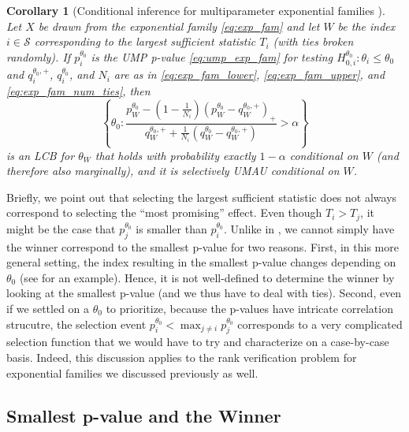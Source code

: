 \documentclass{article}
\newtheorem{corollary}{Corollary}
\begin{document}
\begin{appendix}
\begin{corollary}[Conditional inference for multiparameter exponential families ]
    \label{cor:cond_exp_fam}
    Let $X$ be drawn from the exponential family \eqref{eq:exp_fam} and let $W$ be the index $i \in \mathcal{S}$ corresponding to the largest sufficient statistic $T_i$ (with ties broken randomly). If $p^{\theta_0}_i$ is the UMP p-value \eqref{eq:ump_exp_fam} for testing $H^{\theta_0}_{0, i} : \theta_i \leq \theta_0 $ and $q^{\theta_0, +}_i$, $q^{\theta_0}_i$, and $N_i$ are as in \eqref{eq:exp_fam_lower}, \eqref{eq:exp_fam_upper}, and \eqref{eq:exp_fam_num_ties}, then 
    \begin{equation}
    \label{eq:cond_lcb_exp_fam}
    \left\{\theta_0 :  \frac{p^{\theta_0}_W - \left(1 - \frac{1}{N_i} \right)(p^{\theta_0}_W - q^{\theta_0, +}_W)_+ }{q^{\theta_0, +}_W + \frac{1}{N_i}(q^{\theta_0}_W - q^{\theta_0, +}_W) } > \alpha \right\} 
    \end{equation}
    is an LCB for $\theta_W$ that holds with probability exactly $1-\alpha$ conditional on $W$ (and therefore also marginally), and it is selectively UMAU conditional on $W$.
\end{corollary}

Briefly, we point out that selecting the largest sufficient statistic does not always correspond to selecting the ``most promising'' effect. Even though $T_i > T_j$, it might be the case that $p^{\theta_0}_{j}$ is smaller than $p^{\theta_0}_{i}$.  Unlike in , we cannot simply have the winner correspond to the smallest p-value for two reasons. First, in this more general setting, the index resulting in the smallest p-value changes depending on $\theta_0$ (see  for an example). Hence, it is not well-defined to determine the winner by looking at the smallest p-value (and we thus have to deal with ties). Second, even if we settled on a $\theta_0$ to prioritize, because the p-values have intricate correlation strucutre, the selection event $p^{\theta_0}_{i} < \max_{j \neq i} p^{\theta_0}_{j}$ corresponds to a very complicated selection function that we would have to try and characterize on a case-by-case basis. Indeed, this discussion applies to the rank verification problem for exponential families we discussed previously as well. 

\iffalse

\subsection{Smallest p-value and the Winner}
\label{sec:small_p_val_appdx}


\end{appendix}
\end{document}
